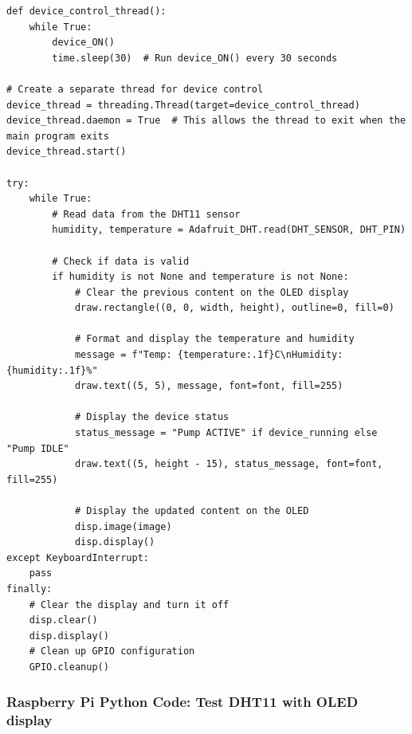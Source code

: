 \documentclass{article}
\begin{document}
\begin{lstlisting}[style=pythonstyle]
def device_control_thread():
    while True:
        device_ON()
        time.sleep(30)  # Run device_ON() every 30 seconds

# Create a separate thread for device control
device_thread = threading.Thread(target=device_control_thread)
device_thread.daemon = True  # This allows the thread to exit when the main program exits
device_thread.start()

try:
    while True:
        # Read data from the DHT11 sensor
        humidity, temperature = Adafruit_DHT.read(DHT_SENSOR, DHT_PIN)

        # Check if data is valid
        if humidity is not None and temperature is not None:
            # Clear the previous content on the OLED display
            draw.rectangle((0, 0, width, height), outline=0, fill=0)

            # Format and display the temperature and humidity
            message = f"Temp: {temperature:.1f}C\nHumidity: {humidity:.1f}%"
            draw.text((5, 5), message, font=font, fill=255)

            # Display the device status
            status_message = "Pump ACTIVE" if device_running else "Pump IDLE"
            draw.text((5, height - 15), status_message, font=font, fill=255)

            # Display the updated content on the OLED
            disp.image(image)
            disp.display()
except KeyboardInterrupt:
    pass
finally:
    # Clear the display and turn it off
    disp.clear()
    disp.display()
    # Clean up GPIO configuration
    GPIO.cleanup()
\end{lstlisting}

		\subsubsection{Raspberry Pi Python Code: Test DHT11 with OLED display}
		
\end{document}
